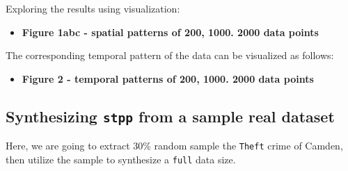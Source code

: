 \documentclass[
  16pt,
]{article}
\providecommand{\tightlist}{%
  \setlength{\itemsep}{0pt}\setlength{\parskip}{0pt}}
\begin{document}
Exploring the results using visualization:

\begin{itemize}
\tightlist
\item
  \textbf{Figure 1abc - spatial patterns of 200, 1000. 2000 data points}
\end{itemize}

The corresponding temporal pattern of the data can be visualized as
follows:

\begin{itemize}
\tightlist
\item
  \textbf{Figure 2 - temporal patterns of 200, 1000. 2000 data points}
\end{itemize}

\hypertarget{synthesizing-stpp-from-a-sample-real-dataset}{%
\subsection{\texorpdfstring{Synthesizing \texttt{stpp} from a sample
real
dataset}{Synthesizing stpp from a sample real dataset}}\label{synthesizing-stpp-from-a-sample-real-dataset}}

Here, we are going to extract 30\% random sample the \texttt{Theft}
crime of Camden, then utilize the sample to synthesize a \texttt{full}
data size.
\end{document}
